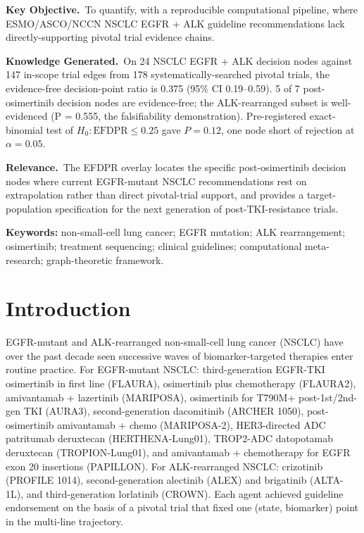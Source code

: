 \documentclass[11pt,a4paper]{article}
\begin{document}
\medskip
\begin{mdframed}[linewidth=0.5pt,roundcorner=4pt,backgroundcolor=gray!8]
\small
\textbf{Key Objective.}\,
To quantify, with a reproducible computational pipeline, where ESMO/ASCO/NCCN NSCLC EGFR + ALK guideline recommendations lack directly-supporting pivotal trial evidence chains.

\textbf{Knowledge Generated.}\,
On 24 NSCLC EGFR + ALK decision nodes against 147 in-scope trial edges from 178 systematically-searched pivotal trials, the evidence-free decision-point ratio is 0.375 (95\% CI 0.19--0.59). 5 of 7 post-osimertinib decision nodes are evidence-free; the ALK-rearranged subset is well-evidenced (P = 0.555, the falsifiability demonstration). Pre-registered exact-binomial test of $H_0: \mathrm{EFDPR} \le 0.25$ gave $P = 0.12$, one node short of rejection at $\alpha = 0.05$.

\textbf{Relevance.}\,
The EFDPR overlay locates the specific post-osimertinib decision nodes where current EGFR-mutant NSCLC recommendations rest on extrapolation rather than direct pivotal-trial support, and provides a target-population specification for the next generation of post-TKI-resistance trials.
\end{mdframed}

\medskip
\noindent\textbf{Keywords:} non-small-cell lung cancer; EGFR mutation; ALK rearrangement; osimertinib; treatment sequencing; clinical guidelines; computational meta-research; graph-theoretic framework.

\section{Introduction}\label{sec:intro}
EGFR-mutant and ALK-rearranged non-small-cell lung cancer (NSCLC) have over the past decade seen successive waves of biomarker-targeted therapies enter routine practice. For EGFR-mutant NSCLC: third-generation EGFR-TKI osimertinib in first line (FLAURA),\citep{soria2018flaura} osimertinib plus chemotherapy (FLAURA2),\citep{janne2024flaura2} amivantamab + lazertinib (MARIPOSA),\citep{cho2024mariposa} osimertinib for T790M+ post-1st/2nd-gen TKI (AURA3),\citep{mok2017aura3} second-generation dacomitinib (ARCHER 1050),\citep{wu2017archer1050} post-osimertinib amivantamab + chemo (MARIPOSA-2),\citep{passaro2024mariposa2} HER3-directed ADC patritumab deruxtecan (HERTHENA-Lung01),\citep{yu2024herthena} TROP2-ADC datopotamab deruxtecan (TROPION-Lung01),\citep{ahn2024tropion} and amivantamab + chemotherapy for EGFR exon 20 insertions (PAPILLON).\citep{zhou2024papillon} For ALK-rearranged NSCLC: crizotinib (PROFILE 1014),\citep{solomon2014profile1014} second-generation alectinib (ALEX)\citep{peters2017alex} and brigatinib (ALTA-1L),\citep{camidge2018altal1} and third-generation lorlatinib (CROWN).\citep{shaw2020crown} Each agent achieved guideline endorsement\citep{hendriks2023esmo,nccn_nsclc_2024} on the basis of a pivotal trial that fixed one (state, biomarker) point in the multi-line trajectory.
\end{document}
